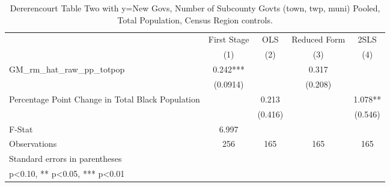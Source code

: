 \begin{table}[htbp]\centering
\def\sym#1{\ifmmode^{#1}\else\(^{#1}\)\fi}
\caption{Dererencourt Table Two with y=New Govs, Number of Subcounty Govts (town, twp, muni)  Pooled, Total Population, Census Region controls.}
\begin{tabular}{l*{4}{c}}
\toprule
                    & First Stage   &         OLS   &Reduced Form   &        2SLS   \\
                    &\multicolumn{1}{c}{(1)}   &\multicolumn{1}{c}{(2)}   &\multicolumn{1}{c}{(3)}   &\multicolumn{1}{c}{(4)}   \\
\midrule
GM\_rm\_hat\_raw\_pp\_totpop&       0.242***&               &       0.317   &               \\
                    &    (0.0914)   &               &     (0.208)   &               \\
\addlinespace
Percentage Point Change in Total Black Population&               &       0.213   &               &       1.078** \\
                    &               &     (0.416)   &               &     (0.546)   \\
\midrule
F-Stat              &       6.997   &               &               &               \\
Observations        &         256   &         165   &         165   &         165   \\
\bottomrule
\multicolumn{5}{l}{\footnotesize Standard errors in parentheses}\\
\multicolumn{5}{l}{\footnotesize * p<0.10, ** p<0.05, *** p<0.01}\\
\end{tabular}
\end{table}
